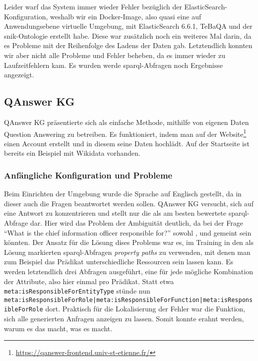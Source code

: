Leider warf das System immer wieder Fehler bezüglich der ElasticSearch-Konfiguration, weshalb wir ein Docker-Image,
also quasi eine auf Anwendungsebene virtuelle Umgebung, mit ElasticSearch 6.6.1, TeBaQA und der \ac{snik}-Ontologie erstellt habe.
Diese war zusätzlich noch ein weiteres Mal darin, da es Probleme mit der Reihenfolge des Ladens der Daten gab.
Letztendlich konnten wir aber nicht alle Probleme und Fehler beheben, da es immer wieder zu Laufzeitfehlern kam.
Es wurden werde \ac{sparql}-Abfragen noch Ergebnisse angezeigt.

\subsection{QAnswer KG}

QAnswer KG präsentierte sich als einfache Methode, mithilfe von eigenen Daten Question Answering zu betreiben.
Es funktioniert, indem man auf der Website\footnote{\url{https://qanswer-frontend.univ-st-etienne.fr/}} einen Account erstellt und in diesem seine Daten hochlädt.
Auf der Startseite ist bereits ein Beispiel mit Wikidata vorhanden.

\subsubsection{Anfängliche Konfiguration und Probleme}

Beim Einrichten der Umgebung wurde die Sprache auf Englisch gestellt, da in dieser auch die Fragen beantwortet werden sollen.
QAnswer KG versucht, sich auf eine Antwort zu konzentrieren und stellt nur die als am besten bewertete \ac{sparql}-Abfrage dar.
Hier wird das Problem der Ambiguität deutlich, da bei der Frage \enquote{What is the chief information officer responsible for?} sowohl
,  und  gemeint sein könnten.
Der Ansatz für die Lösung dises Problems war es, im Training in den als Lösung markierten \ac{sparql}-Abfragen \emph{property paths} zu verwenden,
mit denen man zum Beispiel das Prädikat unterschiedliche Ressourcen sein lassen kann.
Es werden letztendlich drei Abfragen ausgeführt, eine für jede mögliche Kombination der Attribute, also hier einmal pro Prädikat.
Statt etwa \texttt{meta:isResponsibleForEntityType} stünde nun \texttt{meta:isResponsibleForRole|meta:isResponsibleForFunction|meta:isResponsibleForRole} dort.
Praktisch für die Lokalisierung der Fehler war die Funktion, sich alle generierten Anfragen anzeigen zu lassen.
Somit konnte erahnt werden, warum es das macht, was es macht.

